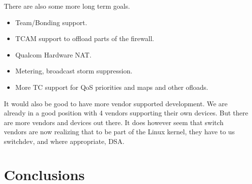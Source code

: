 \documentclass[letterpaper]{article}
\begin{document}
There are also some more long term goals.

\begin{itemize}
\item Team/Bonding support.
\item TCAM support to offload parts of the firewall.
\item Qualcom Hardware NAT.
\item Metering, broadcast storm suppression.
\item More TC support for QoS priorities and maps and other ofloads.
\end{itemize}

It would also be good to have more vendor supported development. We
are already in a good position with 4 vendors supporting their own
devices. But there are more vendors and devices out there. It does
however seem that switch vendors are now realizing that to be part of
the Linux kernel, they have to us switchdev, and where appropriate,
DSA.

\section{Conclusions}
\end{document}
